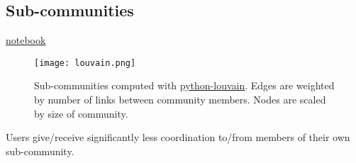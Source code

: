 \documentclass[12pt]{scrartcl}
\begin{document}
\subsection{Sub-communities}
\href{https://github.com/winobes/lasn/blob/3a8dfcb1e48c56d07c0afe8973993c1c853d3908/code/analysis.ipynb}{notebook}

\begin{figure}[H]
\centering
\texttt{[image: louvain.png]}
\caption{Sub-communities computed with \href{https://github.com/taynaud/python-louvain}{python-louvain}. Edges are weighted by number of links between community members. Nodes are scaled by size of community.}
\end{figure}

Users give/receive significantly less coordination to/from members of their own sub-community.



\end{document}
